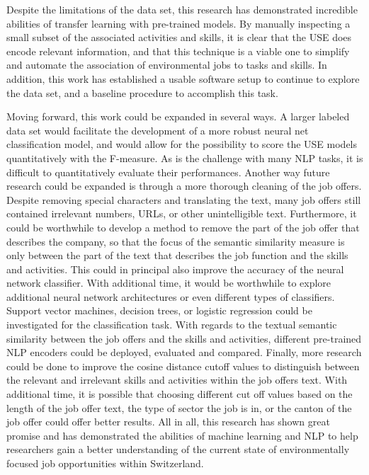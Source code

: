 Despite the limitations of the data set, this research has demonstrated incredible abilities of transfer learning with pre-trained models. By manually inspecting a small subset of the associated activities and skills, it is clear that the USE does encode relevant information, and that this technique is a viable one to simplify and automate the association of environmental jobs to tasks and skills. In addition, this work has established a usable software setup to continue to explore the data set, and a baseline procedure to accomplish this task.

Moving forward, this work could be expanded in several ways. A larger labeled data set would facilitate the development of a more robust neural net classification model, and would allow for the possibility to score the USE models quantitatively with the F-measure. As is the challenge with many NLP tasks, it is difficult to quantitatively evaluate their performances. Another way future research could be expanded is through a more thorough cleaning of the job offers. Despite removing special characters and translating the text, many job offers still contained irrelevant numbers, URLs, or other unintelligible text. Furthermore, it could be worthwhile to develop a method to remove the part of the job offer that describes the company, so that the focus of the semantic similarity measure is only between the part of the text that describes the job function and the skills and activities. This could in principal also improve the accuracy of the neural network classifier. 
With additional time, it would be worthwhile to explore additional neural network architectures or even different types of classifiers. Support vector machines, decision trees, or logistic regression could be investigated for the classification task. With regards to the textual semantic similarity between the job offers and the skills and activities, different pre-trained NLP encoders could be deployed, evaluated and compared. Finally, more research could be done to improve the cosine distance cutoff values to distinguish between the relevant and irrelevant skills and activities within the job offers text. With additional time, it is possible that choosing different cut off values based on the length of the job offer text, the type of sector the job is in, or the canton of the job offer could offer better results. All in all, this research has shown great promise and has demonstrated the abilities of machine learning and NLP to help researchers gain a better understanding of the current state of environmentally focused job opportunities within Switzerland.  
